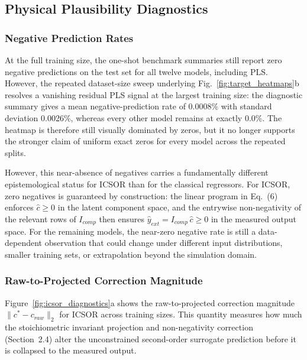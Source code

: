 \documentclass[11pt]{article}
\begin{document}
\subsection{Physical Plausibility Diagnostics}

\subsubsection{Negative Prediction Rates}

At the full training size, the one-shot benchmark summaries still report zero negative predictions on the test set for all twelve models, including PLS. However, the repeated dataset-size sweep underlying Fig.~\ref{fig:target_heatmaps}b resolves a vanishing residual PLS signal at the largest training size: the diagnostic summary gives a mean negative-prediction rate of 0.0008\% with standard deviation 0.0026\%, whereas every other model remains at exactly 0.0\%. The heatmap is therefore still visually dominated by zeros, but it no longer supports the stronger claim of uniform exact zeros for every model across the repeated splits.

However, this near-absence of negatives carries a fundamentally different epistemological status for ICSOR than for the classical regressors. For ICSOR, zero negatives is guaranteed by construction: the linear program in Eq.~(6) enforces $\hat{c} \ge 0$ in the latent component space, and the entrywise non-negativity of the relevant rows of $I_{comp}$ then ensures $\hat{y}_{ext} = I_{comp}\,\hat{c} \ge 0$ in the measured output space. For the remaining models, the near-zero negative rate is still a data-dependent observation that could change under different input distributions, smaller training sets, or extrapolation beyond the simulation domain.

\subsubsection{Raw-to-Projected Correction Magnitude}

Figure~\ref{fig:icsor_diagnostics}a shows the raw-to-projected correction magnitude $\|c^* - c_{raw}\|_2$ for ICSOR across training sizes. This quantity measures how much the stoichiometric invariant projection and non-negativity correction (Section~2.4) alter the unconstrained second-order surrogate prediction before it is collapsed to the measured output.
\end{document}
